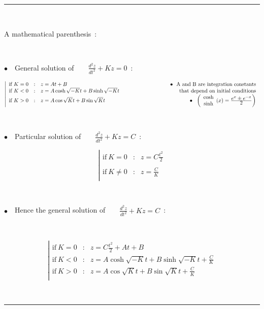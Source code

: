 \documentclass[12pt]{paper}
\newcommand{\nib}{\noindent $\bullet$~}
\newcommand{\blue}{\color{blue}}
\begin{document}
{\blue 

\rule{24cm}{0.5mm}

~

A mathematical parenthesis~: 

~

\nib\ General solution of ~  ~ $\frac{\textstyle{d^2z}}{\textstyle{dt^2}} + K z   = 0$~: 

$$\left| 
\begin{array}{lclr} 
\textrm{if} ~ K  = 0 & : & z = A t + B  & \hspace{3cm}  \textrm{\nib\ A and B are integration constants}       \\
\textrm{if} ~ K  < 0 & : & z = A \cosh\sqrt{-K} t + B \sinh\sqrt{-K} t   &  \textrm{that depend on initial conditions}    \\
\textrm{if} ~ K  > 0 & : & z = A \cos\sqrt{K} t  + B \sin\sqrt{K} t   &\textrm{\nib\ } \left( \begin{array}{c} \cosh \\ \sinh \end{array} (x) = \frac{\textstyle{e^x \pm e^{-x}}}{\textstyle{2}} \right)   
\end{array} 
\right.$$

~

\nib\ Particular solution of ~  ~  $\frac{\textstyle{d^2z}}{\textstyle{dt^2}} + K z   = C$~: 

$$\left| 
\begin{array}{lcl} 
\textrm{if} ~ K     = 0 & : & z = C    \frac{\textstyle{t^2}}{\textstyle{2}}    \\
\\[-1ex]
\textrm{if} ~ K  \neq 0 & : & z =  \frac{\textstyle{C}}{\textstyle{K}}    \\
\end{array} 
\right.$$


~

\nib\ Hence the general solution of ~  ~ $\frac{\textstyle{d^2z}}{\textstyle{dt^2}} + K z   = C$~: 

~

$$\left| 
\begin{array}{lclr} 
\textrm{if} ~ K  = 0 & : & z =  C    \frac{\textstyle{t^2}}{\textstyle{2}}   + A t + B        \\
\textrm{if} ~ K  < 0 & : & z = A \cosh\sqrt{-K} t + B \sinh\sqrt{-K} t +  \frac{\textstyle{C}}{\textstyle{K}}    \\
\textrm{if} ~ K  > 0 & : & z = A \cos\sqrt{K} t  + B \sin\sqrt{K} t +  \frac{\textstyle{C}}{\textstyle{K}}    \\
\end{array} 
\right.$$

~

\rule{24cm}{0.5mm}

}
\end{document}
